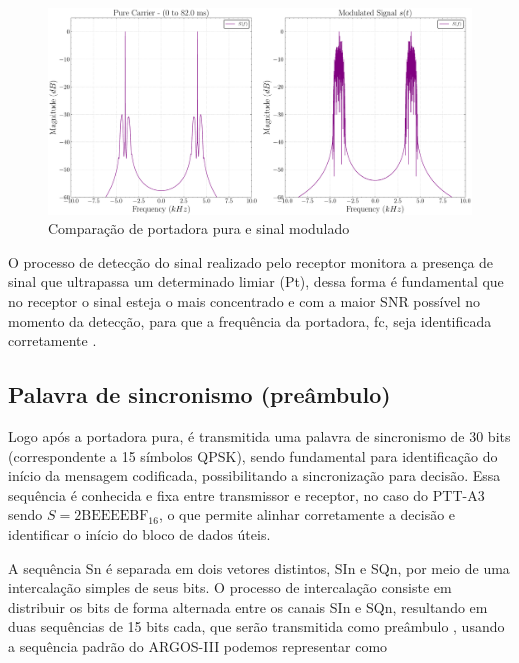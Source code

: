 \begin{figure}[H]
	\centering
	\caption{Comparação de portadora pura e sinal modulado}\label{fig:portadora_pura_freq}
	\includegraphics[width=\linewidth]{assets/cap2/transmitter_modulator_portadora.pdf}
\end{figure}

O processo de detecção do sinal realizado pelo receptor monitora a presença de sinal que ultrapassa um determinado limiar (\gls{Pt}), dessa forma é fundamental que no receptor o sinal esteja o mais concentrado e com a maior \gls{SNR} possível no momento da detecção, para que a frequência da portadora, \gls{fc}, seja identificada corretamente \cite{cnes_services_and_message_formats_ed2_rev2_2006}.


\subsection{Palavra de sincronismo (preâmbulo)}\label{sec:preambulo}

Logo após a portadora pura, é transmitida uma palavra de sincronismo de 30 bits (correspondente a 15 símbolos \gls{QPSK}), sendo fundamental para identificação do início da mensagem codificada, possibilitando a sincronização para decisão. Essa sequência é conhecida e fixa entre transmissor e receptor, no caso do \gls{PTT-A3} sendo $S = \text{2BEEEEBF}_{16}$, o que permite alinhar corretamente a decisão e identificar o início do bloco de dados úteis. \cite{cnes_services_and_message_formats_ed2_rev2_2006}

A sequência \gls{Sn} é separada em dois vetores distintos, \gls{SIn} e \gls{SQn}, por meio de uma intercalação simples de seus bits. O processo de intercalação consiste em distribuir os bits de forma alternada entre os canais \gls{SIn} e \gls{SQn}, resultando em duas sequências de 15 bits cada, que serão transmitida como preâmbulo \cite{cnes_services_and_message_formats_ed2_rev2_2006}, usando a sequência padrão do \gls{ARGOS-III} podemos representar como

